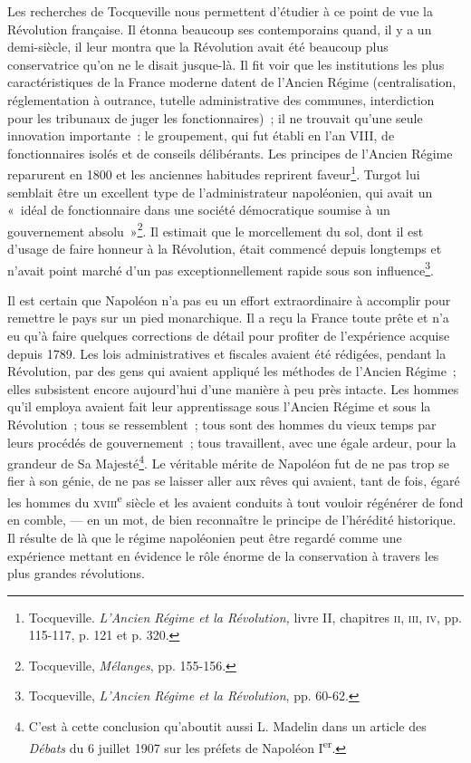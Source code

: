 \documentclass[french,twoside]{book} %
\begin{document}
\noindent Les recherches de Tocqueville nous permettent d’étudier à ce point de vue la Révolution française. Il étonna beaucoup ses contemporains quand, il y a un demi-siècle, il leur montra que la Révolution avait été beaucoup plus conservatrice qu’on ne le disait jusque-là. Il fit voir que les institutions les plus caractéristiques de la France moderne datent de l’Ancien Régime (centralisation, réglementation à outrance, tutelle administrative des communes, interdiction pour les tribunaux de juger les fonctionnaires) ; il ne trouvait qu’une seule innovation importante : le groupement, qui fut établi en l’an VIII, de fonctionnaires isolés et de conseils délibérants. Les principes de l’Ancien Régime reparurent en 1800 et les anciennes habitudes reprirent faveur\footnote{ \noindent Tocqueville. \emph{L’Ancien Régime et la Révolution,} livre II, chapitres {\scshape ii}, {\scshape iii}, {\scshape iv}, pp. 115-117, p. 121 et p. 320.
 }. Turgot lui semblait être un excellent type de l’administrateur napoléonien, qui avait un « idéal de fonctionnaire dans une société démocratique soumise à un gouvernement absolu »\footnote{ \noindent Tocqueville, \emph{Mélanges}, pp. 155-156.
 }. Il estimait que le morcellement du sol, dont il est d’usage de faire honneur à la Révolution,  était commencé depuis longtemps et n’avait point marché d’un pas exceptionnellement rapide sous son influence\footnote{ \noindent Tocqueville, \emph{L’Ancien Régime et la Révolution}, pp. 60-62.
 }.\par
Il est certain que Napoléon n’a pas eu un effort extraordinaire à accomplir pour remettre le pays sur un pied monarchique. Il a reçu la France toute prête et n’a eu qu’à faire quelques corrections de détail pour profiter de l’expérience acquise depuis 1789. Les lois administratives et fiscales avaient été rédigées, pendant la Révolution, par des gens qui avaient appliqué les méthodes de l’Ancien Régime ; elles subsistent encore aujourd’hui d’une manière à peu près intacte. Les hommes qu’il employa avaient fait leur apprentissage sous l’Ancien Régime et sous la Révolution ; tous se ressemblent ; tous sont des hommes du vieux temps par leurs procédés de gouvernement ; tous travaillent, avec une égale ardeur, pour la grandeur de Sa Majesté\footnote{ \noindent C’est à cette conclusion qu’aboutit aussi L. Madelin dans un article des \emph{Débats} du 6 juillet 1907 sur les préfets de Napoléon I\textsuperscript{er}.
 }. Le véritable mérite de Napoléon fut de ne pas trop se fier à son génie, de ne pas se laisser aller aux rêves qui avaient, tant de fois, égaré les hommes du {\scshape xviii}\textsuperscript{e} siècle et les avaient conduits à tout vouloir régénérer de fond en comble, — en un mot, de bien reconnaître le principe de l’hérédité historique. Il résulte de là que le régime napoléonien peut être regardé comme une expérience mettant en évidence le rôle énorme de la conservation à travers les plus grandes révolutions.\par
\end{document}
